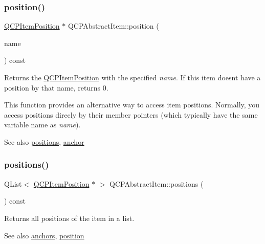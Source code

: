 \subsubsection{\texorpdfstring{position()}{position()}}
{\footnotesize\ttfamily \hyperlink{classQCPItemPosition}{Q\+C\+P\+Item\+Position} $\ast$ Q\+C\+P\+Abstract\+Item\+::position (\begin{DoxyParamCaption}\item[{const Q\+String \&}]{name }\end{DoxyParamCaption}) const}

Returns the \hyperlink{classQCPItemPosition}{Q\+C\+P\+Item\+Position} with the specified {\itshape name}. If this item doesn\textquotesingle{}t have a position by that name, returns 0.

This function provides an alternative way to access item positions. Normally, you access positions direcly by their member pointers (which typically have the same variable name as {\itshape name}).

\begin{DoxySeeAlso}{See also}
\hyperlink{classQCPAbstractItem_a709f655ac3f7f22d452714134662b454}{positions}, \hyperlink{classQCPAbstractItem_a139c255ea8831642fac91748e29a5adb}{anchor} 
\end{DoxySeeAlso}
\mbox{\label{classQCPAbstractItem_a709f655ac3f7f22d452714134662b454}} 
\subsubsection{\texorpdfstring{positions()}{positions()}}
{\footnotesize\ttfamily Q\+List$<$ \hyperlink{classQCPItemPosition}{Q\+C\+P\+Item\+Position} $\ast$ $>$ Q\+C\+P\+Abstract\+Item\+::positions (\begin{DoxyParamCaption}{ }\end{DoxyParamCaption}) const\hspace{0.3cm}{\ttfamily [inline]}}

Returns all positions of the item in a list.

\begin{DoxySeeAlso}{See also}
\hyperlink{classQCPAbstractItem_a81d1ecfea3368b836cf9675a0045e659}{anchors}, \hyperlink{classQCPAbstractItem_a2589c3d298f9a576d77d9addb440a18d}{position} 
\end{DoxySeeAlso}
\mbox{\label{classQCPAbstractItem_aa5cffb034fc65dbb91c77e02c1c14251}} 
